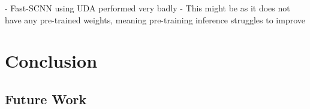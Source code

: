 \documentclass[a4paper,12pt]{report}
\begin{document}
- Fast-SCNN using UDA performed very badly
- This might be as it does not have any pre-trained weights, meaning pre-training inference struggles to improve

\FloatBarrier


\chapter{Conclusion}
\section{Future Work}


{}

\end{document}
